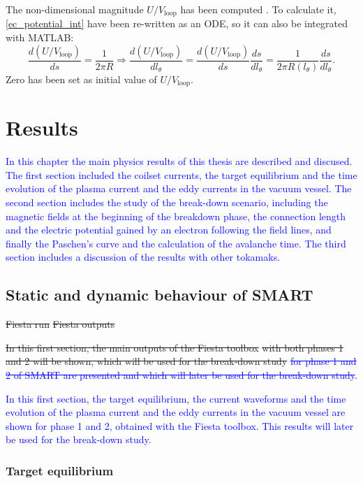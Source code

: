 \documentclass[a4paper,12pt,oneside]{book}
\begin{document}
The non-dimensional magnitude $U/V_\text{loop}$ has been computed  \cite{Lazarus_1998}. To calculate it, \eqref{ec_potential_int} have been re-written as an ODE, so it can also be integrated with MATLAB:
%
\begin{equation}
\dfrac{d(U/V_\text{loop})}{ds}= \dfrac{1}{2 \pi R} \Rightarrow \dfrac{d(U/V_\text{loop})}{d l_\theta }=\dfrac{d(U/V_\text{loop})}{ds} \dfrac{ds}{d l_\theta}= \dfrac{1}{2 \pi R(l_\theta)} \dfrac{ds}{d l_\theta} .
\end{equation}
Zero has been set as initial value of $U/V_\text{loop}$.



\chapter{Results}
\label{sec_results}

\textcolor{blue}{In this chapter the main physics results of this thesis are described and discused. The first section included the coilset currents, the target equilibrium and the time evolution of the plasma current and the eddy currents in the vacuum vessel. The second section includes the study of the break-down scenario, including the magnetic fields at the beginning of the breakdown phase, the connection length and the electric potential gained by an electron following the field lines, and finally the Paschen's curve and the calculation of the avalanche time. The third section includes a discussion of the results with other tokamaks.}

\section{Static and dynamic behaviour of SMART}
\st{Fiesta run} \st{Fiesta outputs}

\st{In this first section, the main outputs of the Fiesta toolbox} \st{with both phases 1 and 2 will be shown, which will be used for the break-down study} \textcolor{blue}{\st{ for phase 1 and 2 of SMART are presented and which will later be used for the break-down study}.}

\textcolor{blue}{In this first section, the target equilibrium, the current waveforms and the time evolution of the plasma current and the eddy currents in the vacuum vessel are shown for phase 1 and 2, obtained with the Fiesta toolbox. This results will later be used for the break-down study.}

\subsection{Target equilibrium}
\end{document}
